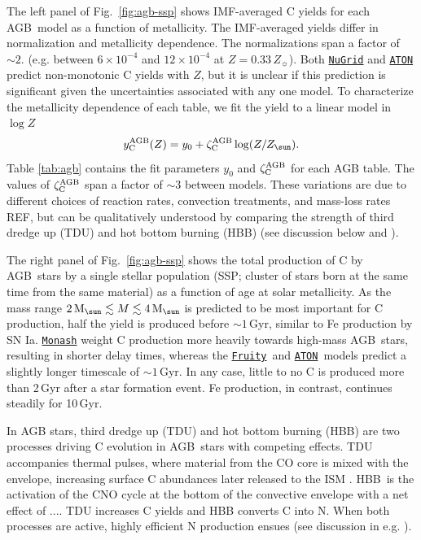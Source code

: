 \documentclass[fleqn,
usenatbib]{mnras}
\makeatletter
\newcommand{\JJ}{\citetalias{james+21}}
\newcommand{\fruity}{\texttt{\hyperlink{fruity}{Fruity}}}
\newcommand{\nugrid}{\texttt{\hyperlink{nugrid}{NuGrid}}}
\newcommand{\monash}{\texttt{\hyperlink{monash}{Monash}}}
\newcommand{\aton}{\texttt{\hyperlink{aton}{ATON}}}
\newcommand{\agb}{AGB}
\newcommand{\ia}{SN Ia}
\newcommand{\C}[1][\@nil]{
    \def\tmp{#1}%
    \ifx\tmp\@nnil%
        \ensuremath{\rm C}%
    \else%
        \ifmmode ^{#1}{\rm C}%
        \else $^{#1}$C%
        \fi%
\fi }
\newcommand{\zagb}{\zeta_{\rm C}^{\rm AGB}}
\newcommand{\Mo}{ {\rm M}_{\sun}}
\newcommand{\Zo}{ Z_{\sun}}
\newcommand{\about}[1]{${\sim} #1$}
\newcommand{\dbadd}[1]{{\color{Thistle} #1}}
\makeatother
\begin{document}
The left panel of Fig.~\ref{fig:agb-ssp} shows IMF-averaged C yields for each \agb\ model as a function of metallicity.
The IMF-averaged yields differ in normalization and metallicity dependence.  
The normalizations span a factor of \about{2}. (e.g. between $6\times 10^{-4}$ and $12 \times 10^{-4}$ at $Z=0.33\,\Zo$).
Both \nugrid{} and \aton{} predict non-monotonic C yields with $Z$, but it is unclear if this prediction is significant given the uncertainties associated with any one model.
To characterize the metallicity dependence of each table, we fit the yield to a linear model in $\log Z$
\begin{equation}\label{eq:agb_z_approx}
    y_{\rm C}^{\rm AGB}(Z) = y_0 + \zagb \log(Z / \Zo).
\end{equation}
Table \ref{tab:agb} contains the fit parameters $y_0$ and $\zagb$ for each AGB table.
The values of $\zagb$ span a factor of $\sim{3}$ between models.
These variations are due to different choices of reaction rates, convection treatments, and mass-loss rates \citep{ventura+15} \dbadd{REF}, but can be qualitatively understood by comparing the strength of third dredge up (TDU) and hot bottom burning (HBB) (see discussion below and \JJ). 



The right panel of Fig.~\ref{fig:agb-ssp} shows the total production of C by \agb\ stars by a single stellar population (SSP; cluster of stars born at the same time from the same material) as a function of age at solar metallicity. 
As the mass range $2\,\Mo\lesssim M \lesssim 4\,\Mo$ is predicted to be most important for C production, half the yield is produced before \about{1}\,Gyr, similar to Fe production by \ia. 
\monash{} weight C production more heavily towards high-mass \agb\ stars, resulting in shorter delay times, whereas the \fruity\ and \aton\ models predict a slightly longer timescale of \about{1}\,Gyr. In any case, little to no C is produced more than 2\,Gyr after a star formation event. Fe production, in contrast, continues steadily for 10\,Gyr. 

In AGB stars, {third dredge up} (TDU) and {hot bottom burning} (HBB) are two processes driving C evolution in \agb\ stars with competing effects.
TDU accompanies thermal pulses, where material from the CO core is mixed with the envelope, increasing surface C abundances 
later released to the ISM \citep{KL14}.  
HBB\ is the activation of the CNO cycle at the bottom of the convective envelope \dbadd{with a net effect of ...}.
TDU increases C yields and HBB converts C into N. When both processes are active, highly efficient N production ensues (see discussion in e.g. \citealt{james+23, ventura+13}). 
\end{document}
